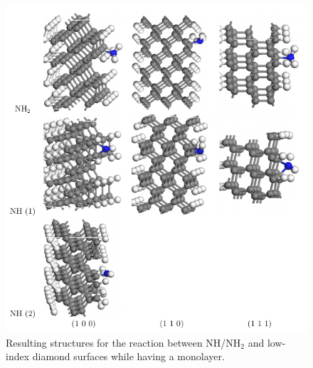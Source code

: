 \documentclass[10pt,a4paper]{article}
\begin{document}
\begin{figure} \captionsetup{width=.8\linewidth}  \caption{Resulting structures for the reaction between NH/NH$_2$ and low-index diamond surfaces while having a monolayer.} \label{highcoverae}
\includegraphics[width=.8\linewidth]{pictures/singleSite_result.png}
\end{figure}



\printbibliography
\end{document}
